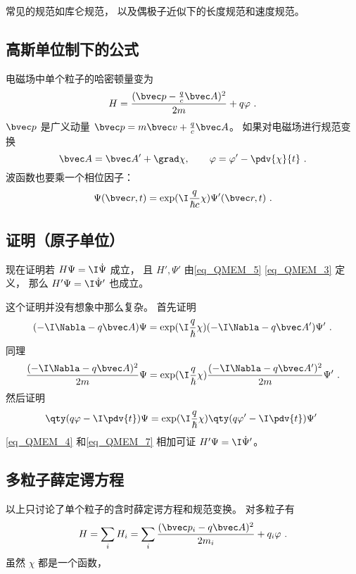 常见的规范如库仑规范， 以及偶极子近似下的长度规范和速度规范。

\subsection{高斯单位制下的公式}
电磁场中单个粒子的哈密顿量变为
\begin{equation}
H = \frac{(\bvec p - \frac{q}{c}\bvec A)^2}{2m} + q\varphi~.
\end{equation}
$\bvec p$ 是广义动量 $\bvec p=m\bvec v+\frac{q}{c}\bvec A$。
如果对电磁场进行规范变换
\begin{equation}
\bvec A=\bvec A'+\grad \chi,\qquad \varphi =\varphi' - \pdv{\chi}{t}~.
\end{equation}
波函数也要乘一个相位因子：
\begin{equation}
\Psi(\bvec r,t)=\exp(\I\frac{q}{\hbar c} \chi)\Psi'(\bvec r,t)~.
\end{equation}

\subsection{证明（原子单位）}
现在证明若 $H\Psi = \I \dot\Psi$ 成立， 且 $H', \Psi'$ 由\autoref{eq_QMEM_5} \autoref{eq_QMEM_3} 定义， 那么 $H'\Psi = \I \dot\Psi'$ 也成立。

这个证明并没有想象中那么复杂。 首先证明
\begin{equation}
(-\I\Nabla - q\bvec A)\Psi = \exp(\I \frac{q}{\hbar}\chi)(-\I\Nabla - q\bvec A')\Psi'~.
\end{equation}
同理
\begin{equation}\label{eq_QMEM_4}
\frac{(-\I\Nabla - q\bvec A)^2}{2m}\Psi = \exp(\I \frac{q}{\hbar}\chi)\frac{(-\I\Nabla - q\bvec A')^2}{2m}\Psi'~.
\end{equation}
然后证明
\begin{equation}\label{eq_QMEM_7}
\qty(q\varphi - \I \pdv{t})\Psi= \exp(\I \frac{q}{\hbar}\chi)\qty(q\varphi' - \I \pdv{t})\Psi'~
\end{equation}
\autoref{eq_QMEM_4} 和\autoref{eq_QMEM_7} 相加可证 $H'\Psi = \I \dot\Psi'$。

\subsection{多粒子薛定谔方程}
以上只讨论了单个粒子的含时薛定谔方程和规范变换。 对多粒子有
\begin{equation}
H = \sum_i H_i = \sum_i \frac{(\bvec p_i - q\bvec A)^2}{2m_i} + q_i\varphi~.
\end{equation}
虽然 $\chi$ 都是一个函数， 
